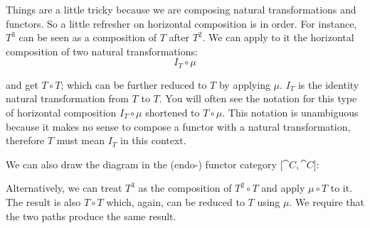 Things are a little tricky because we are composing natural
transformations and functors. So a little refresher on horizontal
composition is in order. For instance, $T^3$ can be seen as a
composition of $T$ after $T^2$. We can apply to it the
horizontal composition of two natural transformations:
\[I_T \circ \mu\]

\begin{figure}[H]
\centering
{}
\end{figure}

\noindent
and get $T \circ T$; which can be further reduced to $T$ by
applying $\mu$. $I_T$ is the identity natural transformation
from $T$ to $T$. You will often see the notation for this
type of horizontal composition $I_T \circ \mu$ shortened to
$T \circ \mu$. This notation is unambiguous because it makes no sense to
compose a functor with a natural transformation, therefore $T$
must mean $I_T$ in this context.

\noindent
We can also draw the diagram in the (endo-) functor category ${[}\cat{C}, \cat{C}{]}$:

\begin{figure}[H]
\centering
{}
\end{figure}

\noindent
Alternatively, we can treat $T^3$ as the composition of
$T^2 \circ T$ and apply $\mu \circ T$ to it. The result is also
$T \circ T$ which, again, can be reduced to $T$ using $\mu$. We
require that the two paths produce the same result.

